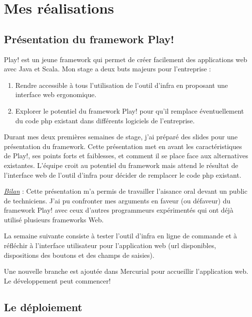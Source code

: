 
\chapter{Mes réalisations}

\section{Présentation du framework Play!}

Play! est un jeune framework qui permet de créer facilement des
applications web avec Java et Scala.
Mon stage a deux buts majeurs pour l'entreprise :

\begin{enumerate}
\item Rendre accessible à tous l'utilisation de l'outil d'infra en proposant
  une interface web ergonomique.
\item Explorer le potentiel du framework Play! pour qu'il remplace
  éventuellement du code php existant dans différents logiciels de
  l'entreprise.
\end{enumerate}

Durant mes deux premières semaines de stage, j'ai préparé des slides pour une
présentation du framework. Cette présentation met en avant les caractéristiques
de Play!, ses points forts et faiblesses, et comment il se place face aux
alternatives existantes.
L'équipe croit au potentiel du framework mais attend le résultat de
l'interface web de l'outil d'infra pour décider de remplacer le code php
existant.

\underline{\textit{Bilan}} : Cette présentation m'a permis de travailler
l'aisance oral devant un public de techniciens. J'ai pu confronter mes arguments
en faveur (ou défaveur) du framework Play! avec ceux d'autres programmeurs
expérimentés qui ont déjà utilisé plusieurs frameworks Web.

\noindent\hrulefill

La semaine suivante consiste à tester l'outil d'infra en ligne de
commande et à réfléchir à l'interface utilisateur pour l'application web (url
disponibles, dispositions des boutons et des champs de saisies).

Une nouvelle branche est ajoutée dans Mercurial pour accueillir l'application web.
Le développement peut commencer!


\section{Le déploiement}

